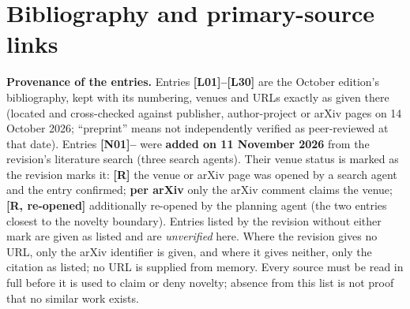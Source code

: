 \documentclass[10pt,a4paper]{article}
\begin{document}
\section{Bibliography and primary-source links}
\label{sec:bibliography}

{\sloppy
\textbf{Provenance of the entries.} Entries \textbf{[L01]--[L30]} are the October edition's bibliography, kept with
its numbering, venues and URLs exactly as given there (located and cross-checked against publisher,
author-project or arXiv pages on 14 October 2026; ``preprint'' means not independently verified as peer-reviewed
at that date). Entries \textbf{[N01]--} were \textbf{added on 11 November 2026} from the revision's literature
search (three search agents). Their venue status is marked as the revision marks it: \textbf{[R]} the venue or
arXiv page was opened by a search agent and the entry confirmed; \textbf{per arXiv} only the arXiv comment
claims the venue; \textbf{[R, re-opened]} additionally re-opened by the planning agent (the two entries closest to
the novelty boundary). Entries listed by the revision without either mark are given as listed and are
\emph{unverified} here. Where the revision gives no URL, only the arXiv identifier is given, and where it gives
neither, only the citation as listed; no URL is supplied from memory. Every source must be read in full before it
is used to claim or deny novelty; absence from this list is not proof that no similar work exists.

}
\end{document}
